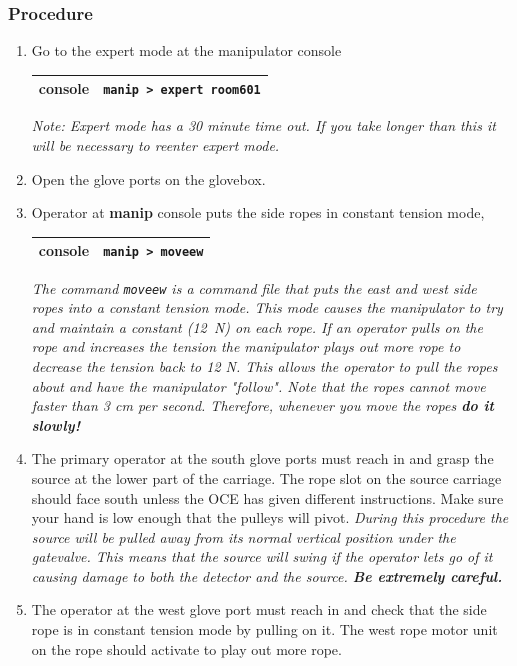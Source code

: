 \documentclass[11pt]{article}
\begin{document}
\subsubsection{Procedure}
\begin{enumerate}
\item \CheckBox[name=aesr1]{} Go to the expert mode at the manipulator console
\begin{center}
\begin{tabular}{|c|c|}
\hline
console & \verb+manip > expert room601+\\
\hline
\end{tabular}
\end{center}
{\it Note: Expert mode has a 30 minute time out. If you take longer than this it will be necessary to reenter expert mode.}
\item \CheckBox[name=aesr2]{} Open the glove ports on the glovebox.
\item \CheckBox[name=aesr3]{} Operator at {\bf manip} console puts the side ropes in constant tension mode,
\begin{center}
\begin{tabular}{|c|c|}
\hline
console & \verb+manip > moveew+\\
\hline
\end{tabular}
\end{center}
{\it The command \verb+moveew+ is a command file that puts the east and west side ropes into a constant tension mode. This mode causes the manipulator to try and maintain a constant (12~N) on each rope. If an operator pulls on the rope and increases the tension the manipulator plays out more rope to decrease the tension back to 12 N. This allows the operator to pull the ropes about and have the manipulator "follow". Note that the ropes cannot move faster than 3 cm per second. Therefore, whenever you move the ropes {\bf do it slowly!}}
\item \CheckBox[name=aesr4]{} The primary operator at the south glove ports must reach in and grasp the source at the lower part of the carriage. The rope slot on the source carriage should face south unless the OCE has given different instructions. Make sure your hand is low enough that the pulleys will pivot. {\it During this procedure the source will be pulled away from its normal vertical position under the gatevalve. This means that the source will swing if the operator lets go of it causing damage to both the detector and the source. {\bf Be extremely careful.}}
\item \CheckBox[name=aesr5]{} The operator at the west glove port must reach in and check that the side rope is in constant tension mode by pulling on it. The west rope motor unit on the rope should activate to play out more rope.

\end{enumerate}
\end{document}
